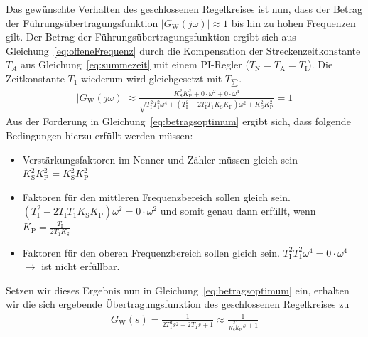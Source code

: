 Das gewünschte Verhalten des geschlossenen Regelkreises ist nun, dass der Betrag der Führungsübertragungsfunktion $|G_{\text{W}}(j\omega)|\approx1$ bis hin zu hohen Frequenzen gilt. 
Der Betrag der Führungsübertragungsfunktion ergibt sich aus Gleichung~\ref{eq:offeneFrequenz} durch die Kompensation der Streckenzeitkonstante $T_{A}$ aus Gleichung~\ref{eq:summezeit} mit einem PI-Regler ($T_{\text{N}}=T_{\text{A}}=T_{\text{I}}$). Die Zeitkonstante $T_{1}$ wiederum wird gleichgesetzt mit $T_{\sum}$. 
%
\begin{equation}
\begin{aligned}
%
|G_{\text{W}}(j\omega)|\approx \frac{K_{\text{S}}^{2}K_{\text{P}}^{2}+0\cdot\omega^{2}+0\cdot\omega^{4}}{\sqrt{T^{2}_{\text{I}}T^{2}_{1}\omega^{4}+\left(T^{2}_{\text{I}}-2T_{\text{I}}T_{\text{1}}K_{\text{S}}K_{\text{P}}\right)\omega^{2}+K_{\text{S}}^{2}K_{\text{P}}^{2}}}=1\label{eq:betragsoptimum}
%
\end{aligned}
\end{equation}
%
Aus der Forderung in Gleichung~\ref{eq:betragsoptimum} ergibt sich, dass folgende Bedingungen hierzu erfüllt werden müssen:
%
\begin{itemize}
	\item Verstärkungsfaktoren im Nenner und Zähler müssen gleich sein $K_{\text{S}}^{2}K_{\text{P}}^{2}=K_{\text{S}}^{2}K_{\text{P}}^{2}$
	\item Faktoren für den mittleren Frequenzbereich sollen gleich sein. $\left(T^{2}_{\text{I}}-2T_{\text{I}}T_{\text{1}}K_{\text{S}}K_{\text{P}}\right)\omega^{2}=0\cdot\omega^{2}$ und somit genau dann erfüllt, wenn $K_{\text{P}}=\frac{T_{\text{I}}}{2T_{1}K_{\text{S}}}$
	\item Faktoren für den oberen Frequenzbereich sollen gleich sein. $T^{2}_{\text{I}}T^{2}_{1}\omega^{4}=0\cdot\omega^{4}$ $\rightarrow$ ist nicht erfüllbar.
\end{itemize}
%
%
Setzen wir dieses Ergebnis nun in Gleichung~\ref{eq:betragsoptimum} ein, erhalten wir die sich ergebende Übertragungsfunktion des geschlossenen Regelkreises zu
%
\begin{equation}
\begin{aligned}
%
%
G_{\text{W}}(s)=\frac{1}{2T_{1}^{2}s^{2}+2T_{1}s+1}\approx \frac{1}{\frac{T_{I}}{K_{\text{S}}K_{\text{P}}}s+1}
%
\end{aligned}
\end{equation}
